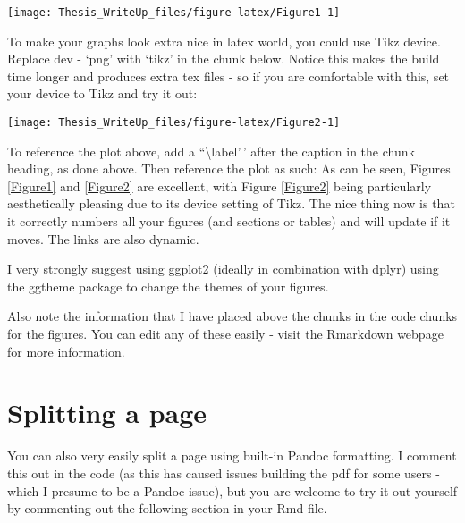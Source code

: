 \documentclass[11pt,preprint, authoryear]{elsarticle}
\let\origfigure\figure
\let\endorigfigure\endfigure
\renewenvironment{figure}[1][2] {
    \expandafter\origfigure\expandafter[H]
} {
    \endorigfigure
}
\numberwithin{equation}{section}
\numberwithin{figure}{section}
\numberwithin{table}{section}
\begin{document}
\begin{figure}[H]

{\centering \texttt{[image: Thesis\_WriteUp\_files/figure-latex/Figure1-1]} 

}

\caption{Caption Here \label{Figure1}}\label{fig:Figure1}
\end{figure}

To make your graphs look extra nice in latex world, you could use Tikz
device. Replace dev - `png' with `tikz' in the chunk below. Notice this
makes the build time longer and produces extra tex files - so if you are
comfortable with this, set your device to Tikz and try it out:

\begin{figure}[H]

{\centering \texttt{[image: Thesis\_WriteUp\_files/figure-latex/Figure2-1]} 

}

\caption{Caption Here \label{Figure2}}\label{fig:Figure2}
\end{figure}

To reference the plot above, add a ``\textbackslash label'\,' after the
caption in the chunk heading, as done above. Then reference the plot as
such: As can be seen, Figures \ref{Figure1} and \ref{Figure2} are
excellent, with Figure \ref{Figure2} being particularly aesthetically
pleasing due to its device setting of Tikz. The nice thing now is that
it correctly numbers all your figures (and sections or tables) and will
update if it moves. The links are also dynamic.

I very strongly suggest using ggplot2 (ideally in combination with
dplyr) using the ggtheme package to change the themes of your figures.

Also note the information that I have placed above the chunks in the
code chunks for the figures. You can edit any of these easily - visit
the Rmarkdown webpage for more information.

\hypertarget{splitting-a-page}{%
\section{Splitting a page}\label{splitting-a-page}}

You can also very easily split a page using built-in Pandoc formatting.
I comment this out in the code (as this has caused issues building the
pdf for some users - which I presume to be a Pandoc issue), but you are
welcome to try it out yourself by commenting out the following section
in your Rmd file.
\end{document}
